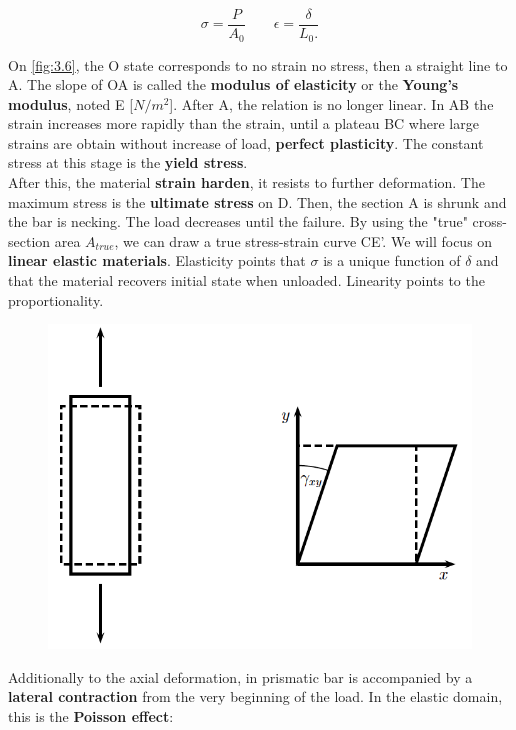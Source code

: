 			\begin{equation}
			\sigma = \frac{P}{A_0} \qquad \epsilon = \frac{\delta}{L_0.}	
			\end{equation}			 
			
			On \autoref{fig:3.6}, the O state corresponds to no strain no stress, then a straight line to A. The slope of OA is called the \textbf{modulus of elasticity} or the \textbf{Young's modulus}, noted E [$N/m^2$]. After A, the relation is no longer linear. In AB the strain increases more rapidly than the strain, until a plateau BC where large strains are obtain without increase of load, \textbf{perfect plasticity}. The constant stress at this stage is the \textbf{yield stress}. \\
			
			After this, the material \textbf{strain harden}, it resists to further deformation. The maximum stress is the \textbf{ultimate stress} on D. Then, the section A is shrunk and the bar is necking. The load decreases until the failure. By using the "true" cross-section area $A_{true}$, we can draw a true stress-strain curve CE'. We will focus on \textbf{linear elastic materials}. Elasticity points that $\sigma$ is a unique function of $\delta$ and that the material recovers initial state when unloaded. Linearity points to the proportionality. \\
			
			\begin{figure}
			\vspace{-10mm}	
			\includegraphics[scale=0.3]{ch3/7}
			\label{fig:3.7}
			\end{figure}		
			Additionally to the axial deformation, in prismatic bar is accompanied by a \textbf{lateral contraction} from the very beginning of the load. In the elastic domain, this is the \textbf{Poisson effect}: 
			
